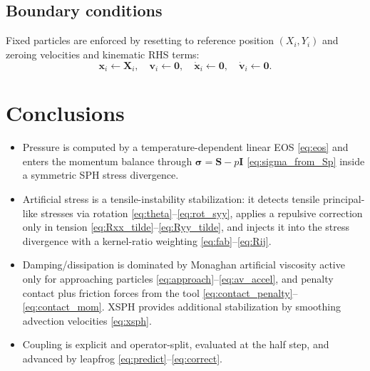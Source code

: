 \documentclass[11pt]{article}
\begin{document}
\subsection{Boundary conditions}

Fixed particles are enforced by resetting to reference position $(X_i,Y_i)$ and zeroing velocities and kinematic RHS terms:
\begin{equation}
\bm{x}_i \leftarrow \bm{X}_i,\quad \bm{v}_i\leftarrow \bm{0},\quad \dot{\bm{x}}_i\leftarrow \bm{0},\quad \dot{\bm{v}}_i\leftarrow \bm{0}.
\label{eq:fixed_bc}
\end{equation}

\section{Conclusions}

\begin{itemize}
  \item Pressure is computed by a temperature-dependent linear EOS \eqref{eq:eos} and enters the momentum balance through $\bm{\sigma}=\bm{S}-p\bm{I}$ \eqref{eq:sigma_from_Sp} inside a symmetric SPH stress divergence.
  \item Artificial stress is a tensile-instability stabilization: it detects tensile principal-like stresses via rotation \eqref{eq:theta}--\eqref{eq:rot_syy}, applies a repulsive correction only in tension \eqref{eq:Rxx_tilde}--\eqref{eq:Ryy_tilde}, and injects it into the stress divergence with a kernel-ratio weighting \eqref{eq:fab}--\eqref{eq:Rij}.
  \item Damping/dissipation is dominated by Monaghan artificial viscosity active only for approaching particles \eqref{eq:approach}--\eqref{eq:av_accel}, and penalty contact plus friction forces from the tool \eqref{eq:contact_penalty}--\eqref{eq:contact_mom}. XSPH provides additional stabilization by smoothing advection velocities \eqref{eq:xsph}.
  \item Coupling is explicit and operator-split, evaluated at the half step, and advanced by leapfrog \eqref{eq:predict}--\eqref{eq:correct}.
\end{itemize}
\end{document}
